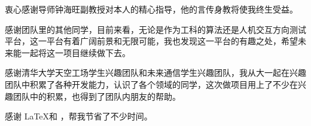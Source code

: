 \begin{acknowledgement}
  衷心感谢导师钟海旺副教授对本人的精心指导，他的言传身教将使我终生受益。

  感谢团队里的其他同学，目前来看，无论是作为工科的算法还是人机交互方向测试平台，这一平台有着广阔前景和无限可能，我也发现这一平台的有趣之处，希望未来能一起将这一项目继续做下去。

  感谢清华大学天空工场学生兴趣团队和未来通信学生兴趣团队，我从大一起在兴趣团队中积累了各种开发能力，认识了各个领域的同学，这次做项目用上了不少在兴趣团队中的积累，也得到了团队内朋友的帮助。

  感谢 \LaTeX 和 \thuthesis\cite{thuthesis}，帮我节省了不少时间。
\end{acknowledgement}
